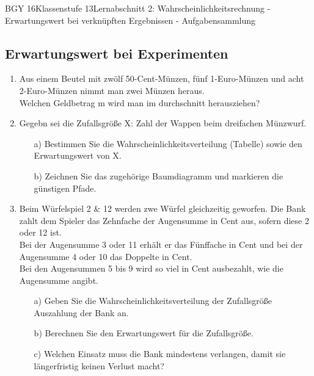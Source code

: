 \documentclass[oneside,openany,headings=optiontotoc,11pt,numbers=noenddot]{scrreprt}
\begin{document}
	\begin{worksheet}{BGY 16}{Klassenstufe 13}{Lernabschnitt 2: Wahrscheinlichkeitsrechnung - Erwartungswert bei verknüpften Ergebnissen - Aufgabensammlung}
		\noindent
		\sffamily
		\begin{framed}
			\noindent
			\section*{Erwartungswert bei Experimenten}
			\begin{enumerate}
				\item Aus einem Beutel mit zwölf 50-Cent-Münzen, fünf 1-Euro-Münzen und acht 2-Euro-Münzen nimmt man zwei Münzen heraus.\\
				Welchen Geldbetrag m wird man im durchschnitt herausziehen?
				\item Gegebn sei die Zufallsgröße X: \glqq{}Zahl der Wappen beim dreifachen Münzwurf\grqq{}.\\
				\begin{itemize}
					\item[a)] Bestimmen Sie die Wahrscheinlichkeitsverteilung (Tabelle) sowie den Erwartungswert von X.
					\item[b)] Zeichnen Sie das zugehörige Baumdiagramm und markieren die günstigen Pfade.
				\end{itemize}
				\item Beim Würfelspiel \grqq{}2 \& 12\grqq{} werden zwe Würfel gleichzeitig geworfen. Die Bank zahlt dem Spieler das Zehnfache der Augensumme in Cent aus, sofern diese 2 oder 12 ist.\\
				Bei der Augensumme 3 oder 11 erhält er das Fünffache in Cent und bei der Augensumme 4 oder 10 das Doppelte in Cent.\\
				Bei den Augensummen 5 bis 9 wird so viel in Cent ausbezahlt, wie die Augensumme angibt.
				\begin{itemize}
					\item[a)] Geben Sie die Wahrscheinlichkeitsverteilung der Zufallsgröße \glqq{}Auszahlung der Bank\grqq{} an.
					\item[b)] Berechnen Sie den Erwartungswert für die Zufallsgröße.
					\item[c)] Welchen Einsatz muss die Bank mindestens verlangen, damit sie längerfristig keinen Verlust macht?
				\end{itemize}
			\end{enumerate}

\end{framed}
\end{worksheet}
\end{document}
